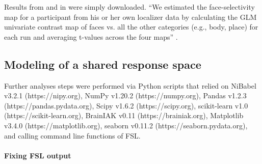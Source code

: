 


%
Results from \citet{sengupta2016extension} and in
\citet{haeusler2022processing} were simply downloaded.
%
``We estimated the face-selectivity map for a participant from his or her own
localizer data by calculating the GLM univariate contrast map of faces vs. all
the other categories (e.g., body, place) for each run and averaging t-values
across the four maps'' \citep{jiahui2020predicting}.


\subsection{Modeling of a shared response space}


Further analyses steps were performed via Python scripts that relied on
%
NiBabel v3.2.1 (https://nipy.org),
%
NumPy v1.20.2 (https://numpy.org),
%
Pandas v1.2.3 (https://pandas.pydata.org),
%
Scipy v1.6.2 (https://scipy.org),
%
scikit-learn v1.0 (https://scikit-learn.org),
%
BrainIAK v0.11 (https://brainiak.org),
%
Matplotlib v3.4.0 (https://matplotlib.org),
%
seaborn v0.11.2 (https://seaborn.pydata.org),
%
and calling command line functions of FSL.

\paragraph{Fixing FSL output}




